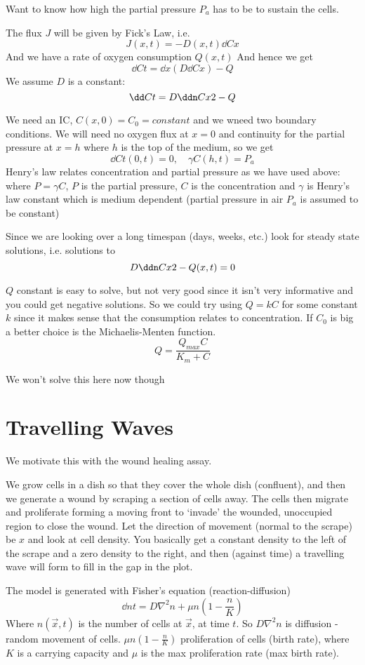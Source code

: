 \documentclass{X:/Documents/Coding/Latex/myassignment}
\begin{document}
Want to know how high the partial pressure $P_a$ has to be to sustain the cells.

The flux $J$ will be given by Fick's Law, i.e.
\[J(x,t) = -D(x,t) \dd Cx\]
And we have a rate of oxygen consumption $Q(x,t)$ 
And hence we get
\[\dd Ct = \dd{}x\left(D \dd Cx\right) - Q\]
We assume $D$ is a constant:
\[\dd Ct = D\ddn Cx2 - Q\]

We need an IC, $C(x,0) = C_0 = constant$ and we wneed two boundary conditions.
We will need no oxygen flux at $x=0$ and continuity for the partial pressure at $x=h$ where $h$ is the top of the medium, so we get
\[\dd Ct(0,t) = 0, \quad \gamma C(h,t) = P_a\]
Henry's law relates concentration and partial pressure as we have used above: where $P = \gamma C$, $P$ is the partial pressure, $C$ is the concentration and $\gamma$ is Henry's law constant which is medium dependent (partial pressure in air $P_a$ is assumed to be constant)

Since we are looking over a long timespan (days, weeks, etc.) look for steady state solutions, i.e. solutions to
\[D \ddn Cx2 - Q(x,t) = 0\]

$Q$ constant is easy to solve, but not very good since it isn't very informative and you could get negative solutions. So we could try using $Q = kC$ for some constant $k$ since it makes sense that the consumption relates to concentration. If $C_0$ is big a better choice is the Michaelis-Menten function.
\[Q = \frac{Q_{max} C}{K_m +C}\] 

We won't solve this here now though


\section{Travelling Waves}
We motivate this with the wound healing assay.

We grow cells in a dish so that they cover the whole dish (confluent), and then we generate a wound by scraping a section of cells away. The cells then migrate and proliferate forming a moving front to `invade' the wounded, unoccupied region to close the wound.
Let the direction of movement (normal to the scrape) be $x$ and look at cell density. You basically get a constant density to the left of the scrape and a zero density to the right, and then (against time) a travelling wave will form to fill in the gap in the plot.

The model is generated with Fisher's equation (reaction-diffusion)
\[\dd nt = D\nabla^2 n + \mu n(1- \frac{n}{K})\]
Where $n(\vec x,t)$ is the number of cells at $\vec x$, at time $t$.
So $D\nabla^2 n$ is diffusion - random movement of cells. $\mu n(1- \frac{n}{K})$ proliferation of cells (birth rate), where $K$ is a carrying capacity and $\mu$ is the max proliferation rate (max birth rate).
\end{document}
